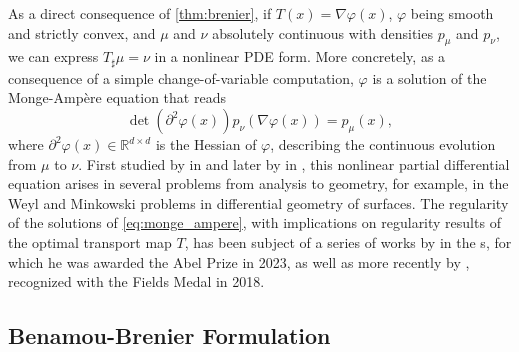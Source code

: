 As a direct consequence of \cref{thm:brenier}, if $T(x) = \nabla \varphi(x)$, $\varphi$ being smooth and strictly convex, and $\mu$ and $\nu$ absolutely continuous with densities $p_\mu$ and $p_\nu$, we can express $T_\sharp \mu = \nu$ in a nonlinear \acrfull{PDE} form. More concretely, as a consequence of a simple change-of-variable computation, $\varphi$ is a solution of the Monge-Amp{\`e}re equation that reads
\begin{equation} \label{eq:monge_ampere}
	\operatorname{det}\left(\partial^2 \varphi(x)\right) p_\nu(\nabla \varphi(x))=p_\mu(x),
\end{equation}
where $\partial^2 \varphi(x) \in \mathbb{R}^{d \times d}$ is the Hessian of $\varphi$, describing the continuous evolution from $\mu$ to $\nu$.
First studied by \citeauthor{monge1781histoire} in \citeyear{monge1781histoire} and later by \citeauthor{ampere1819memoire} in \citeyear{ampere1819memoire}, this nonlinear partial differential equation arises in several problems from analysis to geometry, for example, in the Weyl and Minkowski problems in differential geometry of surfaces. 
The regularity of the solutions of \eqref{eq:monge_ampere}, with implications on regularity results of the optimal transport map $T$, has been subject of a series of works by \citeauthor{caffarelli1990interior} in the \citeyear{caffarelli1990interior}s, for which he was awarded the Abel Prize in 2023, as well as more recently by \citeauthor{figalli2017monge}, recognized with the Fields Medal in 2018.


\subsection{Benamou-Brenier Formulation} \label{sec:background_benamou_brenier}


